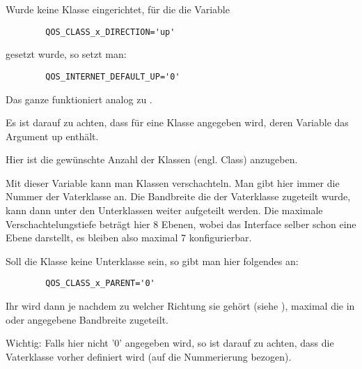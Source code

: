 \begin{description}
   Wurde keine Klasse eingerichtet, für die die Variable
\begin{example}
\begin{verbatim}
        QOS_CLASS_x_DIRECTION='up'
\end{verbatim}
\end{example}

gesetzt wurde, so setzt man:
\begin{example}
\begin{verbatim}
        QOS_INTERNET_DEFAULT_UP='0'
\end{verbatim}
\end{example}

   Das ganze funktioniert analog zu .

   Es ist darauf zu achten, dass für  eine Klasse
   angegeben wird, deren  Variable das Argument
   up enthält.


   Hier ist die gewünschte Anzahl der Klassen (engl. Class) anzugeben.



   Mit dieser Variable kann man Klassen verschachteln. Man gibt hier
   immer die Nummer der Vaterklasse an. Die Bandbreite die der
   Vaterklasse zugeteilt wurde, kann dann unter den Unterklassen weiter
   aufgeteilt werden. Die maximale Verschachtelungstiefe beträgt hier 8
   Ebenen, wobei das Interface selber schon eine Ebene darstellt, es
   bleiben also maximal 7 konfigurierbar.

   Soll die Klasse keine Unterklasse sein, so gibt man hier folgendes an:

\begin{example}
\begin{verbatim}
        QOS_CLASS_x_PARENT='0'
\end{verbatim}
\end{example}

   Ihr wird dann je nachdem zu welcher Richtung sie gehört (siehe 
   ), maximal die in 
   oder  angegebene Bandbreite zugeteilt.

   Wichtig: Falls hier nicht '0' angegeben wird, so ist darauf zu achten,
   dass die Vaterklasse vorher definiert wird (auf die Nummerierung bezogen).



\end{description}
